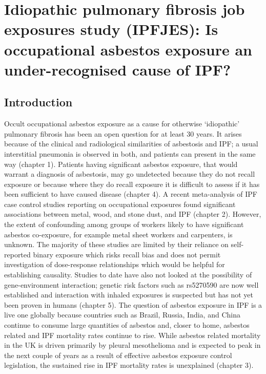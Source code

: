 \hypertarget{idiopathic-pulmonary-fibrosis-job-exposures-study-ipfjes-is-occupational-asbestos-exposure-an-under-recognised-cause-of-ipf}{%
\section{Idiopathic pulmonary fibrosis job exposures study (IPFJES): Is
occupational asbestos exposure an under-recognised cause of
IPF?}\label{idiopathic-pulmonary-fibrosis-job-exposures-study-ipfjes-is-occupational-asbestos-exposure-an-under-recognised-cause-of-ipf}}

\hypertarget{introduction}{%
\subsection{Introduction}\label{introduction}}

Occult occupational asbestos exposure as a cause for otherwise
`idiopathic' pulmonary fibrosis has been an open question for at least
30 years. It arises because of the clinical and radiological
similarities of asbestosis and IPF; a usual interstitial pneumonia is
observed in both, and patients can present in the same way (chapter 1).
Patients having significant asbestos exposure, that would warrant a
diagnosis of asbestosis, may go undetected because they do not recall
exposure or because where they do recall exposure it is difficult to
assess if it has been sufficient to have caused disease (chapter 4). A
recent meta-analysis of IPF case control studies reporting on
occupational exposures found significant associations between metal,
wood, and stone dust, and IPF (chapter 2). However, the extent of
confounding among groups of workers likely to have significant asbestos
co-exposure, for example metal sheet workers and carpenters, is unknown.
The majority of these studies are limited by their reliance on
self-reported binary exposure which risks recall bias and does not
permit investigation of dose-response relationships which would be
helpful for establishing causality. Studies to date have also not looked
at the possibility of gene-environment interaction; genetic risk factors
such as rs5270590 are now well established and interaction with inhaled
exposures is suspected but has not yet been proven in humans (chapter
5). The question of asbestos exposure in IPF is a live one globally
because countries such as Brazil, Russia, India, and China continue to
consume large quantities of asbestos and, closer to home, asbestos
related and IPF mortality rates continue to rise. While asbestos related
mortality in the UK is driven primarily by pleural mesothelioma and is
expected to peak in the next couple of years as a result of effective
asbestos exposure control legislation, the sustained rise in IPF
mortality rates is unexplained (chapter 3).

